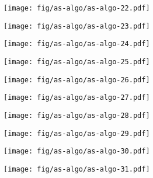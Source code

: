 \documentclass{beamer}
\begin{document}
\begin{frame}
\begin{columns}[t]
\begin{column}{7cm}
      {
        \begin{figure}[h!]
          \centering
          \texttt{[image: fig/as-algo/as-algo-22.pdf]}
      \end{figure}
      }
      {
        \begin{figure}[h!]
          \centering
          \texttt{[image: fig/as-algo/as-algo-23.pdf]}
      \end{figure}
      }
      {
        \begin{figure}[h!]
          \centering
          \texttt{[image: fig/as-algo/as-algo-24.pdf]}
      \end{figure}
      }
      {
        \begin{figure}[h!]
          \centering
          \texttt{[image: fig/as-algo/as-algo-25.pdf]}
      \end{figure}
      }
      {
        \begin{figure}[h!]
          \centering
          \texttt{[image: fig/as-algo/as-algo-26.pdf]}
      \end{figure}
      }
      {
        \begin{figure}[h!]
          \centering
          \texttt{[image: fig/as-algo/as-algo-27.pdf]}
      \end{figure}
      }
      {
        \begin{figure}[h!]
          \centering
          \texttt{[image: fig/as-algo/as-algo-28.pdf]}
      \end{figure}
      }
      {
        \begin{figure}[h!]
          \centering
          \texttt{[image: fig/as-algo/as-algo-29.pdf]}
      \end{figure}
      }
      {
        \begin{figure}[h!]
          \centering
          \texttt{[image: fig/as-algo/as-algo-30.pdf]}
      \end{figure}
      }
      {
        \begin{figure}[h!]
          \centering
          \texttt{[image: fig/as-algo/as-algo-31.pdf]}

\end{figure}}
\end{column}
\end{columns}
\end{frame}
\end{document}
